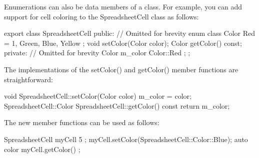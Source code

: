 Enumerations can also be data members of a class. For example, you can add support for cell coloring to the SpreadsheetCell class as follows:

\begin{cpp}
export class SpreadsheetCell
{
    public:
        // Omitted for brevity
        enum class Color { Red = 1, Green, Blue, Yellow };
        void setColor(Color color);
        Color getColor() const;
    private:
        // Omitted for brevity
        Color m_color { Color::Red };
};
\end{cpp}

The implementations of the setColor() and getColor() member functions are straightforward:

\begin{cpp}
void SpreadsheetCell::setColor(Color color) { m_color = color; }
SpreadsheetCell::Color SpreadsheetCell::getColor() const { return m_color; }
\end{cpp}

The new member functions can be used as follows:

\begin{cpp}
SpreadsheetCell myCell { 5 };
myCell.setColor(SpreadsheetCell::Color::Blue);
auto color { myCell.getColor() };
\end{cpp}






















